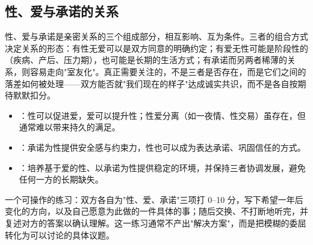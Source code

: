 \subsection{性、爱与承诺的关系}

性、爱与承诺是亲密关系的三个组成部分，相互影响、互为条件。三者的组合方式决定关系的形态：有性无爱可以是双方同意的明确约定；有爱无性可能是阶段性的（疾病、产后、压力期），也可能是长期的生活方式；有承诺而另两者稀薄的关系，则容易走向"室友化"。真正需要关注的，不是三者是否存在，而是它们之间的落差如何被处理——双方能否就"我们现在的样子"达成诚实共识，而不是各自按期待默默扣分。

\begin{itemize}
  \item {}：性可以促进爱，爱可以提升性；性爱分离（如一夜情、性交易）虽存在，但通常难以带来持久的满足。
  \item {}：承诺为性提供安全感与约束力，性也可以成为表达承诺、巩固信任的方式。
  \item {}：培养基于爱的性、以承诺为性提供稳定的环境，并保持三者协调发展，避免任何一方的长期缺失。
\end{itemize}

一个可操作的练习：双方各自为"性、爱、承诺"三项打 0--10 分，写下希望一年后变化的方向，以及自己愿意为此做的一件具体的事；随后交换、不打断地听完，并复述对方的答案以确认理解。这一练习通常不产出"解决方案"，而是把模糊的委屈转化为可以讨论的具体议题。
